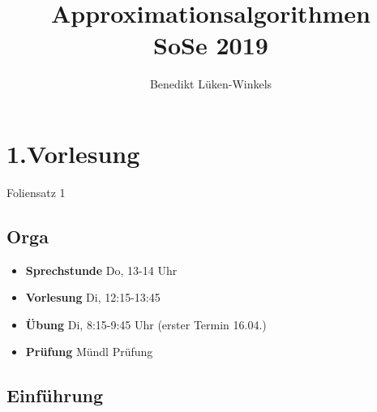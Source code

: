 \documentclass[ngerman]{scrartcl}
\title{Approximationsalgorithmen \\SoSe 2019}
\author{Benedikt Lüken-Winkels}
\begin{document}
\maketitle
\tableofcontents
\newpage
\begin{abstract}

\end{abstract}

\section{1.Vorlesung}
Foliensatz 1
\subsection{Orga}
\begin{itemize}
  \item \textbf{Sprechstunde} Do, 13-14 Uhr
  \item \textbf{Vorlesung} Di, 12:15-13:45
  \item \textbf{Übung} Di, 8:15-9:45 Uhr (erster Termin 16.04.)
  \item \textbf{Prüfung} Mündl Prüfung
\end{itemize}

\subsection{Einführung}
\end{document}
